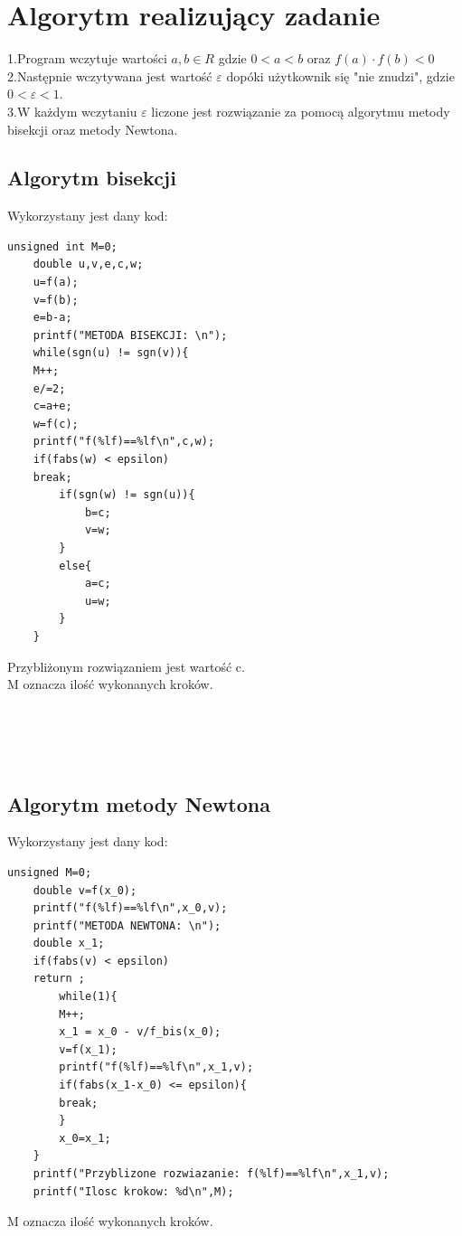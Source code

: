 \documentclass[11pt]{article} %
\begin{document}
\section {Algorytm realizujący zadanie}
1.Program wczytuje wartości $a,b \in R$ gdzie $0<a<b$ oraz $f(a) \cdot f(b) < 0$ \\
2.Następnie wczytywana jest wartość $\varepsilon$ dopóki użytkownik się "nie znudzi", gdzie \\ $0<\varepsilon<1$. \\
3.W każdym wczytaniu $\varepsilon$ liczone jest rozwiązanie za pomocą algorytmu metody bisekcji oraz metody Newtona.
\subsection {Algorytm bisekcji}
Wykorzystany jest dany kod:
\begin{lstlisting}[firstnumber=100]
unsigned int M=0;
	double u,v,e,c,w;
	u=f(a);
	v=f(b);
	e=b-a;
	printf("METODA BISEKCJI: \n");
	while(sgn(u) != sgn(v)){
	M++;
	e/=2;
	c=a+e;
	w=f(c);
	printf("f(%lf)==%lf\n",c,w);
	if(fabs(w) < epsilon)
	break;
		if(sgn(w) != sgn(u)){
			b=c;
			v=w;
		}
		else{
			a=c;
			u=w;
		}
	}
\end{lstlisting}
Przybliżonym rozwiązaniem jest wartość c. \\ M oznacza ilość wykonanych kroków.\\\\\\\\\\
\subsection {Algorytm metody Newtona}
Wykorzystany jest dany kod:
\lstset{language=C}
\begin{lstlisting}[firstnumber=100]
unsigned M=0;
	double v=f(x_0);
	printf("f(%lf)==%lf\n",x_0,v);
	printf("METODA NEWTONA: \n");
	double x_1;
	if(fabs(v) < epsilon)
	return ;
		while(1){
		M++;
		x_1 = x_0 - v/f_bis(x_0);
		v=f(x_1);
		printf("f(%lf)==%lf\n",x_1,v);
		if(fabs(x_1-x_0) <= epsilon){
		break;
		}
		x_0=x_1;
	}
	printf("Przyblizone rozwiazanie: f(%lf)==%lf\n",x_1,v);
	printf("Ilosc krokow: %d\n",M);
\end{lstlisting}
 M oznacza ilość wykonanych kroków.
\end{document}
